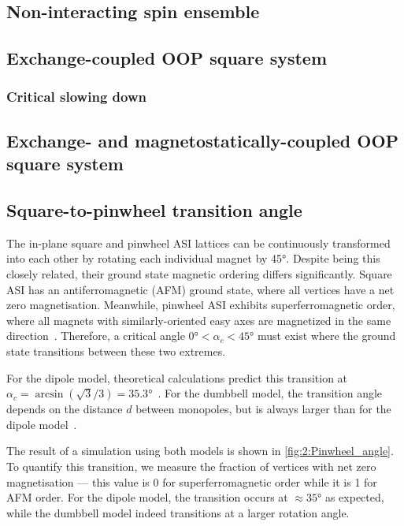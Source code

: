 \subsection{Non-interacting spin ensemble}
\subsection{Exchange-coupled OOP square system}
\subsubsection{Critical slowing down}
\subsection{Exchange- and magnetostatically-coupled OOP square system}
\subsection{Square-to-pinwheel transition angle}\label{sec:2:Verification_IP_SquarePinwheel}
The in-plane square and pinwheel ASI lattices can be continuously transformed into each other by rotating each individual magnet by \ang{45}.
Despite being this closely related, their ground state magnetic ordering differs significantly.
Square ASI has an antiferromagnetic (AFM) ground state, where all vertices have a net zero magnetisation.
Meanwhile, pinwheel ASI exhibits superferromagnetic order, where all magnets with similarly-oriented easy axes are magnetized in the same direction~\cite{ApparentFMpinwheel}.
Therefore, a critical angle $\ang{0} < \alpha_c < \ang{45}$ must exist where the ground state transitions between these two extremes. \par
For the dipole model, theoretical calculations predict this transition at $\alpha_c = \arcsin(\sqrt{3}/3) = \ang{35.3}$~\cite{AFM-FM-transition-Pinwheel,MagicAngle}.
For the dumbbell model, the transition angle depends on the distance $d$ between monopoles, but is always larger than for the dipole model~\cite{AFM-FM-transition-Pinwheel}. \par
The result of a \hotspice simulation using both models is shown in \cref{fig:2:Pinwheel_angle}.
To quantify this transition, we measure the fraction of vertices with net zero magnetisation --- this value is 0 for superferromagnetic order while it is 1 for AFM order.
For the dipole model, the transition occurs at $\approx \ang{35}$ as expected, while the dumbbell model indeed transitions at a larger rotation angle.

